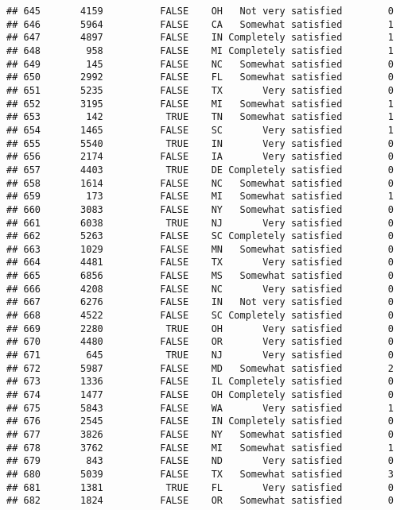 \documentclass[]{book}
\theoremstyle{definition}
\theoremstyle{definition}
\theoremstyle{remark}
\begin{document}
\begin{verbatim}
## 645       4159          FALSE    OH   Not very satisfied        0
## 646       5964          FALSE    CA   Somewhat satisfied        1
## 647       4897          FALSE    IN Completely satisfied        1
## 648        958          FALSE    MI Completely satisfied        1
## 649        145          FALSE    NC   Somewhat satisfied        0
## 650       2992          FALSE    FL   Somewhat satisfied        0
## 651       5235          FALSE    TX       Very satisfied        0
## 652       3195          FALSE    MI   Somewhat satisfied        1
## 653        142           TRUE    TN   Somewhat satisfied        1
## 654       1465          FALSE    SC       Very satisfied        1
## 655       5540           TRUE    IN       Very satisfied        0
## 656       2174          FALSE    IA       Very satisfied        0
## 657       4403           TRUE    DE Completely satisfied        0
## 658       1614          FALSE    NC   Somewhat satisfied        0
## 659        173          FALSE    MI   Somewhat satisfied        1
## 660       3083          FALSE    NY   Somewhat satisfied        0
## 661       6038           TRUE    NJ       Very satisfied        0
## 662       5263          FALSE    SC Completely satisfied        0
## 663       1029          FALSE    MN   Somewhat satisfied        0
## 664       4481          FALSE    TX       Very satisfied        0
## 665       6856          FALSE    MS   Somewhat satisfied        0
## 666       4208          FALSE    NC       Very satisfied        0
## 667       6276          FALSE    IN   Not very satisfied        0
## 668       4522          FALSE    SC Completely satisfied        0
## 669       2280           TRUE    OH       Very satisfied        0
## 670       4480          FALSE    OR       Very satisfied        0
## 671        645           TRUE    NJ       Very satisfied        0
## 672       5987          FALSE    MD   Somewhat satisfied        2
## 673       1336          FALSE    IL Completely satisfied        0
## 674       1477          FALSE    OH Completely satisfied        0
## 675       5843          FALSE    WA       Very satisfied        1
## 676       2545          FALSE    IN Completely satisfied        0
## 677       3826          FALSE    NY   Somewhat satisfied        0
## 678       3762          FALSE    MI   Somewhat satisfied        1
## 679        843          FALSE    ND       Very satisfied        0
## 680       5039          FALSE    TX   Somewhat satisfied        3
## 681       1381           TRUE    FL       Very satisfied        0
## 682       1824          FALSE    OR   Somewhat satisfied        0

\end{verbatim}
\end{document}
